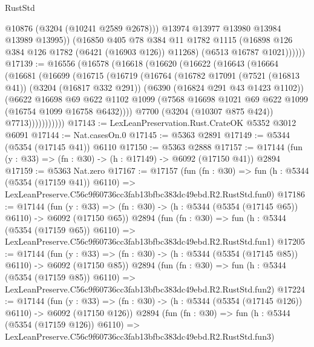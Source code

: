 \begin{lexlean}{RustStd}
\begin{coremodule}
                  @10876
                  (@3204 (@10241 @2589 @2678)))
                @13974
                @13977
                @13980
                @13984
                @13989
                @13995))
            (@16850
              @405
              @78
              @384
              @11
              @1782
              @1115
              (@16898 @126 @384 @126 @1782 (@6421 (@16903 @126)) @11268)
              (@6513 @16787 @1021))))))
@17139 := @16556
    (@16578
      (@16618
        (@16620
          (@16622
            (@16643
              (@16664
                (@16681
                  (@16699
                    (@16715
                      (@16719
                        (@16764
                          (@16782
                            @17091
                            (@7521 (@16813 @41))
                            (@3204 (@16817 @332 @291))
                            (@6390 (@16824 @291 @43 @1423 @1102))
                            (@6622
                              @16698
                              @69
                              @622
                              @1102
                              @1099
                              (@7568 @16698 @1021 @69 @622 @1099 (@16754 @1099 @16758 @6432))))
                          @7700
                          (@3204 (@10307 @875 @424))
                          @7713)))))))))))
@17143 := LexLeanPreservation.Rust.CrateOK @5352 @3012 @6091
@17144 := Nat.casesOn.{0}
@17145 := @5363 @2891
@17149 := @5344 (@5354 (@17145 @41)) @6110
@17150 := @5363 @2888
@17157 := @17144 (fun (y : @33) => (fn : @30) -> (h : @17149) -> @6092 (@17150 @41)) @2894
@17159 := @5363 Nat.zero
@17167 := @17157
    (fun (fn : @30) =>
    fun (h : @5344 (@5354 (@17159 @41)) @6110) =>
    LexLeanPreserve.C56c9f60736cc3fab13bfbc383dc49ebd.R2.RustStd.fun0)
@17186 := @17144
    (fun (y : @33) => (fn : @30) -> (h : @5344 (@5354 (@17145 @65)) @6110) -> @6092 (@17150 @65))
    @2894
    (fun (fn : @30) =>
    fun (h : @5344 (@5354 (@17159 @65)) @6110) =>
    LexLeanPreserve.C56c9f60736cc3fab13bfbc383dc49ebd.R2.RustStd.fun1)
@17205 := @17144
    (fun (y : @33) => (fn : @30) -> (h : @5344 (@5354 (@17145 @85)) @6110) -> @6092 (@17150 @85))
    @2894
    (fun (fn : @30) =>
    fun (h : @5344 (@5354 (@17159 @85)) @6110) =>
    LexLeanPreserve.C56c9f60736cc3fab13bfbc383dc49ebd.R2.RustStd.fun2)
@17224 := @17144
    (fun (y : @33) => (fn : @30) -> (h : @5344 (@5354 (@17145 @126)) @6110) -> @6092 (@17150 @126))
    @2894
    (fun (fn : @30) =>
    fun (h : @5344 (@5354 (@17159 @126)) @6110) =>
    LexLeanPreserve.C56c9f60736cc3fab13bfbc383dc49ebd.R2.RustStd.fun3)

\end{coremodule}
\end{lexlean}
